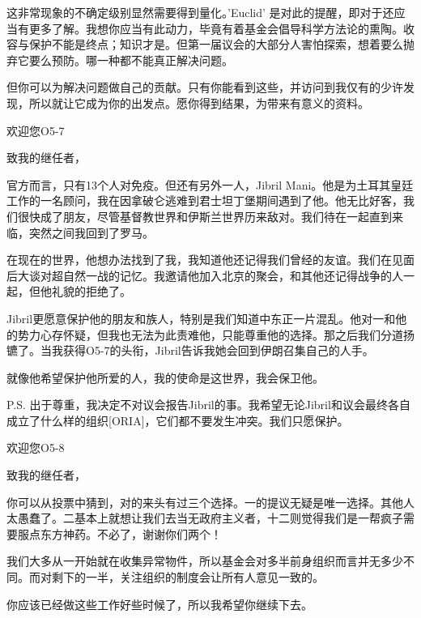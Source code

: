 \begin{whiteboxbb}
\begin{scpbox}
这非常现象的不确定级别显然需要得到量化。'Euclid' 是对此的提醒，即对于还应当有更多了解。我想你应当有此动力，毕竟有着基金会倡导科学方法论的熏陶。收容与保护不能是终点；知识才是。但第一届议会的大部分人害怕探索，想着要么抛弃它要么预防。哪一种都不能真正解决问题。

但你可以为解决问题做自己的贡献。只有你能看到这些，并访问到我仅有的少许发现，所以就让它成为你的出发点。愿你得到结果，为带来有意义的资料。

\end{scpbox}

\begin{scpbox}

欢迎您O5-7

致我的继任者，

官方而言，只有13个人对免疫。但还有另外一人，Jibril Mani。他是为土耳其皇廷工作的一名顾问，我在因拿破仑逃难到君士坦丁堡期间遇到了他。他无比好客，我们很快成了朋友，尽管基督教世界和伊斯兰世界历来敌对。我们待在一起直到来临，突然之间我回到了罗马。

在现在的世界，他想办法找到了我，我知道他还记得我们曾经的友谊。我们在见面后大谈对超自然一战的记忆。我邀请他加入北京的聚会，和其他还记得战争的人一起，但他礼貌的拒绝了。

Jibril更愿意保护他的朋友和族人，特别是我们知道中东正一片混乱。他对一和他的势力心存怀疑，但我也无法为此责难他，只能尊重他的选择。那之后我们分道扬镳了。当我获得O5-7的头衔，Jibril告诉我她会回到伊朗召集自己的人手。

就像他希望保护他所爱的人，我的使命是这世界，我会保卫他。

P.S. 出于尊重，我决定不对议会报告Jibril的事。我希望无论Jibril和议会最终各自成立了什么样的组织[ORIA]，它们都不要发生冲突。我们只愿保护。

\end{scpbox}

\begin{scpbox}

欢迎您O5-8

致我的继任者，

你可以从投票中猜到，对的来头有过三个选择。一的提议无疑是唯一选择。其他人太愚蠢了。二基本上就想让我们去当无政府主义者，十二则觉得我们是一帮疯子需要服点东方神药。不必了，谢谢你们两个！

我们大多从一开始就在收集异常物件，所以基金会对多半前身组织而言并无多少不同。而对剩下的一半，关注组织的制度会让所有人意见一致的。

你应该已经做这些工作好些时候了，所以我希望你继续下去。


\end{scpbox}
\end{whiteboxbb}
